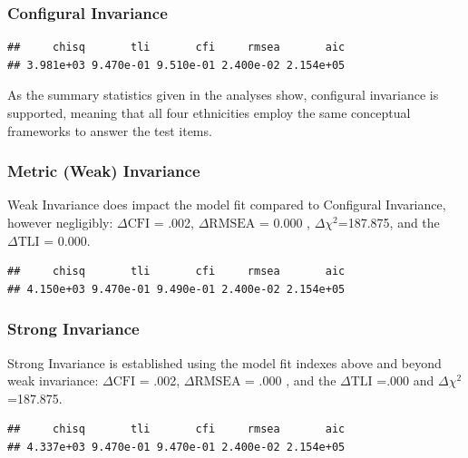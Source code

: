 \documentclass{article}\usepackage[]{graphicx}\usepackage[]{color}
\makeatletter
\newenvironment{kframe}{%
 \def\at@end@of@kframe{}%
 \ifinner\ifhmode%
  \def\at@end@of@kframe{\end{minipage}}%
  \begin{minipage}{\columnwidth}%
 \fi\fi%
 \def\FrameCommand##1{\hskip\@totalleftmargin \hskip-\fboxsep
 \colorbox{shadecolor}{##1}\hskip-\fboxsep
     \hskip-\linewidth \hskip-\@totalleftmargin \hskip\columnwidth}%
 \MakeFramed {\advance\hsize-\width
   \@totalleftmargin\z@ \linewidth\hsize
   \@setminipage}}%
 {\par\unskip\endMakeFramed%
 \at@end@of@kframe}
\newenvironment{knitrout}{}{} %
\makeatother
\begin{document}
\subsubsection*{Configural Invariance}
\begin{knitrout}
\color{fgcolor}\begin{kframe}
\begin{verbatim}
##     chisq       tli       cfi     rmsea       aic 
## 3.981e+03 9.470e-01 9.510e-01 2.400e-02 2.154e+05
\end{verbatim}
\end{kframe}
\end{knitrout}

As the summary statistics given in the analyses show, configural invariance is supported, meaning that all four ethnicities employ the same conceptual frameworks to answer the test items.
\subsubsection*{Metric (Weak) Invariance}
Weak Invariance does impact the model fit compared to Configural Invariance, however negligibly: $\Delta\mathrm{CFI}$ = .002, $\Delta\mathrm{RMSEA}$ = 0.000 , $\Delta$$\chi^2$=187.875, and the $\Delta\mathrm{TLI}$ = 0.000.

\begin{knitrout}
\color{fgcolor}\begin{kframe}
\begin{verbatim}
##     chisq       tli       cfi     rmsea       aic 
## 4.150e+03 9.470e-01 9.490e-01 2.400e-02 2.154e+05
\end{verbatim}
\end{kframe}
\end{knitrout}


\subsubsection*{Strong Invariance}
Strong Invariance is established using the model fit indexes above and beyond weak invariance: $\Delta\mathrm{CFI}$ = .002, $\Delta\mathrm{RMSEA}$ = .000 , and the $\Delta\mathrm{TLI}$ =.000 and $\Delta$$\chi^2$=187.875.

\begin{knitrout}
\color{fgcolor}\begin{kframe}
\begin{verbatim}
##     chisq       tli       cfi     rmsea       aic 
## 4.337e+03 9.470e-01 9.470e-01 2.400e-02 2.154e+05
\end{verbatim}
\end{kframe}
\end{knitrout}
\end{document}
